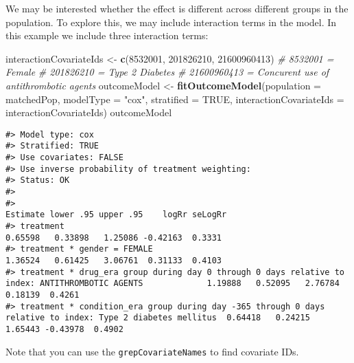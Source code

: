 \documentclass[]{article}
\newenvironment{Shaded}{\begin{snugshade}}{\end{snugshade}}
\newcommand{\CommentTok}[1]{\textcolor[rgb]{0.56,0.35,0.01}{\textit{#1}}}
\newcommand{\DataTypeTok}[1]{\textcolor[rgb]{0.13,0.29,0.53}{#1}}
\newcommand{\DecValTok}[1]{\textcolor[rgb]{0.00,0.00,0.81}{#1}}
\newcommand{\KeywordTok}[1]{\textcolor[rgb]{0.13,0.29,0.53}{\textbf{#1}}}
\newcommand{\NormalTok}[1]{#1}
\newcommand{\OtherTok}[1]{\textcolor[rgb]{0.56,0.35,0.01}{#1}}
\newcommand{\StringTok}[1]{\textcolor[rgb]{0.31,0.60,0.02}{#1}}
\begin{document}
We may be interested whether the effect is different across different
groups in the population. To explore this, we may include interaction
terms in the model. In this example we include three interaction terms:

\fontsize{5.5}{5.5}
\selectfont

\begin{Shaded}
\begin{Highlighting}[]
\NormalTok{interactionCovariateIds <-}\StringTok{ }\KeywordTok{c}\NormalTok{(}\DecValTok{8532001}\NormalTok{, }\DecValTok{201826210}\NormalTok{, }\DecValTok{21600960413}\NormalTok{) }
\CommentTok{# 8532001 = Female}
\CommentTok{# 201826210 = Type 2 Diabetes}
\CommentTok{# 21600960413 = Concurent use of antithrombotic agents}
\NormalTok{outcomeModel <-}\StringTok{ }\KeywordTok{fitOutcomeModel}\NormalTok{(}\DataTypeTok{population =}\NormalTok{ matchedPop,}
                                \DataTypeTok{modelType =} \StringTok{"cox"}\NormalTok{,}
                                \DataTypeTok{stratified =} \OtherTok{TRUE}\NormalTok{,}
                                \DataTypeTok{interactionCovariateIds =}\NormalTok{ interactionCovariateIds)}
\NormalTok{outcomeModel}
\end{Highlighting}
\end{Shaded}

\begin{verbatim}
#> Model type: cox
#> Stratified: TRUE
#> Use covariates: FALSE
#> Use inverse probability of treatment weighting: 
#> Status: OK
#> 
#>                                                                                                            Estimate lower .95 upper .95    logRr seLogRr
#> treatment                                                                                                   0.65598   0.33898   1.25086 -0.42163  0.3331
#> treatment * gender = FEMALE                                                                                 1.36524   0.61425   3.06761  0.31133  0.4103
#> treatment * drug_era group during day 0 through 0 days relative to index: ANTITHROMBOTIC AGENTS             1.19888   0.52095   2.76784  0.18139  0.4261
#> treatment * condition_era group during day -365 through 0 days relative to index: Type 2 diabetes mellitus  0.64418   0.24215   1.65443 -0.43978  0.4902
\end{verbatim}

\fontsize{10}{12}
\selectfont

Note that you can use the \texttt{grepCovariateNames} to find covariate
IDs.
\end{document}
